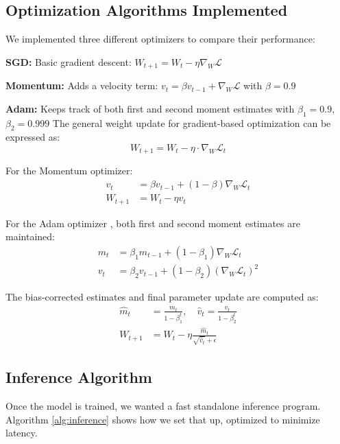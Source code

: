 \documentclass[conference]{IEEEtran}
\begin{document}
\subsection{Optimization Algorithms Implemented}

We implemented three different optimizers to compare their performance:

\textbf{SGD:} Basic gradient descent: $W_{t+1} = W_t - \eta \nabla_W \mathcal{L}$

\textbf{Momentum:} Adds a velocity term: $v_t = \beta v_{t-1} + \nabla_W \mathcal{L}$ with $\beta = 0.9$

\textbf{Adam:} Keeps track of both first and second moment estimates with $\beta_1 = 0.9$, $\beta_2 = 0.999$
The general weight update for gradient-based optimization can be expressed as:
\begin{equation}
W_{t+1} = W_t - \eta \cdot \nabla_W \mathcal{L}_t
\end{equation}

For the Momentum optimizer:
\begin{align}
v_t &= \beta v_{t-1} + (1 - \beta)\nabla_W \mathcal{L}_t \\
W_{t+1} &= W_t - \eta v_t
\end{align}

For the Adam optimizer \cite{b7}, both first and second moment estimates are maintained:
\begin{align}
m_t &= \beta_1 m_{t-1} + (1 - \beta_1)\nabla_W \mathcal{L}_t \\
v_t &= \beta_2 v_{t-1} + (1 - \beta_2)(\nabla_W \mathcal{L}_t)^2
\end{align}

The bias-corrected estimates and final parameter update are computed as:
\begin{align}
\hat{m}_t &= \frac{m_t}{1 - \beta_1^t}, \quad \hat{v}_t = \frac{v_t}{1 - \beta_2^t} \\
W_{t+1} &= W_t - \eta \frac{\hat{m}_t}{\sqrt{\hat{v}_t} + \epsilon}
\end{align}

\subsection{Inference Algorithm}

Once the model is trained, we wanted a fast standalone inference program. Algorithm \ref{alg:inference} shows how we set that up, optimized to minimize latency.
\end{document}
